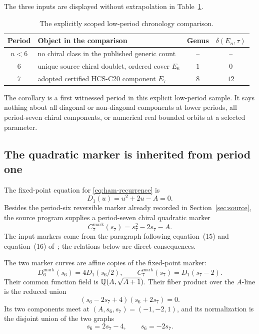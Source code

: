 The three inputs are displayed without extrapolation in
Table~\ref{tab:scoped-threshold}.
\begin{table}[htbp]
\centering
\begin{tabular}{clcc}
\toprule
Period & Object in the comparison & Genus & $\delta(E_n,\tau)$ \\
\midrule
$n<6$ & no chiral class in the published generic count & -- & -- \\
$6$ & unique source chiral doublet, ordered cover $E_6$ & $1$ & $0$ \\
$7$ & adopted certified HCS-C20 component $E_7$ & $8$ & $12$ \\
\bottomrule
\end{tabular}
\caption{The explicitly scoped low-period chronology comparison.}
\label{tab:scoped-threshold}
\end{table}
The corollary is a first witnessed period in this explicit low-period sample.
It says nothing about all diagonal or non-diagonal components at lower
periods, all period-seven chiral components, or numerical real bounded
orbits at a selected parameter.

\subsection{The quadratic marker is inherited from period one}

The fixed-point equation for \eqref{eq:ham-recurrence} is
\begin{equation}\label{eq:d1}
 D_1(u)=u^2+2u-A=0.
\end{equation}
Besides the period-six reversible marker already recorded in
Section~\ref{sec:source}, the source program supplies a period-seven chiral
quadratic marker
\begin{equation}\label{eq:c7-marker}
 C_7^{\mathrm{mark}}(s_7)=s_7^2-2s_7-A.
\end{equation}
The input markers come from the paragraph following equation~(15) and
equation~(16) of~\cite[p.~3]{endlergallas2006chiral}; the relations below are
direct consequences.

\begin{proposition}\label{prop:marker-shadow}
The two marker curves are affine copies of the fixed-point marker:
\begin{equation}\label{eq:marker-alias}
 D_6^{\mathrm{mark}}(s_6)=4D_1(s_6/2),
 \qquad
 C_7^{\mathrm{mark}}(s_7)=D_1(s_7-2).
\end{equation}
Their common function field is $\mathbb Q(A,\sqrt{A+1})$.  Their fiber product over
the $A$-line is the reduced union
\begin{equation}\label{eq:fiber-product}
 (s_6-2s_7+4)(s_6+2s_7)=0.
\end{equation}
Its two components meet at
$(A,s_6,s_7)=(-1,-2,1)$, and its normalization is the disjoint union of the
two graphs
\begin{equation}\label{eq:two-graphs}
 s_6=2s_7-4,
 \qquad
 s_6=-2s_7.
\end{equation}
\end{proposition}

